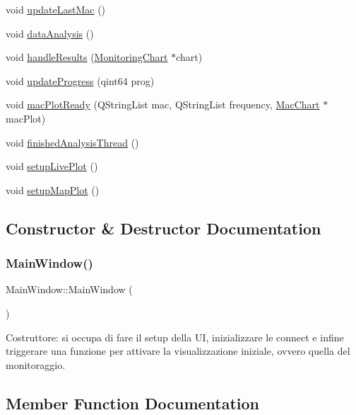 \begin{DoxyCompactItemize}
\item 
void \hyperlink{class_main_window_a723b5a1e4c2d4e52e053edd0b5123b20}{update\+Last\+Mac} ()
\item 
void \hyperlink{class_main_window_a398d1844c3af3e3c888ce2dbfdc61033}{data\+Analysis} ()
\item 
void \hyperlink{class_main_window_af7a262630fb46f1fac49bb816f9e1c30}{handle\+Results} (\hyperlink{class_monitoring_chart}{Monitoring\+Chart} $\ast$chart)
\item 
void \hyperlink{class_main_window_a5334b6d12b44c664697a1447fcbcc18b}{update\+Progress} (qint64 prog)
\item 
void \hyperlink{class_main_window_a3f57c01d85e1d4790edb3308b944e3d2}{mac\+Plot\+Ready} (Q\+String\+List mac, Q\+String\+List frequency, \hyperlink{class_mac_chart}{Mac\+Chart} $\ast$mac\+Plot)
\item 
void \hyperlink{class_main_window_a8daf60fe5b01afd6ffcc54669346f3d8}{finished\+Analysis\+Thread} ()
\item 
void \hyperlink{class_main_window_a0d3c324e794a29ad0b3d54a098f86d5c}{setup\+Live\+Plot} ()
\item 
void \hyperlink{class_main_window_aa09367d7985f9b85de28c04d7f2bb255}{setup\+Map\+Plot} ()
\end{DoxyCompactItemize}


\subsection{Constructor \& Destructor Documentation}
\mbox{\label{class_main_window_a34c4b4207b46d11a4100c9b19f0e81bb}} 
\subsubsection{\texorpdfstring{Main\+Window()}{MainWindow()}}
{\footnotesize\ttfamily Main\+Window\+::\+Main\+Window (\begin{DoxyParamCaption}{ }\end{DoxyParamCaption})}

Costruttore\+: si occupa di fare il setup della UI, inizializzare le connect e infine triggerare una funzione per attivare la visualizzazione iniziale, ovvero quella del monitoraggio. 

\subsection{Member Function Documentation}
\mbox{\label{class_main_window_a6253fe0e0f06ecee8474453d0f0321d0}} 
